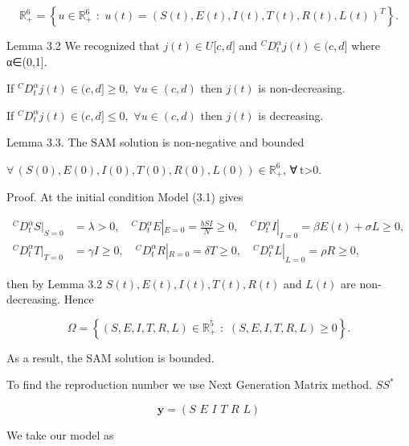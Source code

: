 \documentclass[10pt]{NSP1}
\begin{document}
\[
\mathbb{R}_{+}^{6} = \left\{ u \in \mathbb{R}_{+}^{6}\mspace{6mu}:\mspace{6mu} u(t) = \left( S(t),E(t),I(t),T(t),R(t),L(t) \right)^{T} \right\}.
\]

Lemma 3.2 We recognized that \(j(t) \in U\lbrack c,d\rbrack\) and \(^{C}D_{t}^{\alpha}j(t) \in (c,d\rbrack\) where α∈(0,1].

If \(^{C}D_{t}^{\alpha}j(t) \in (c,d\rbrack \geq 0,\mspace{6mu}\forall u \in (c,d)\) then \(j(t)\) is non-decreasing.

If \(^{C}D_{t}^{\alpha}j(t) \in (c,d\rbrack \leq 0,\mspace{6mu}\forall u \in (c,d)\) then \(j(t)\) is decreasing.

\par\medskip{}\smallskip

Lemma 3.3. The SAM solution is non-negative and bounded

\(\forall\,\left( S(0),E(0),I(0),T(0),R(0),L(0) \right) \in \mathbb{R}_{+}^{6}\), ∀ t\textgreater{}0.

Proof. At the initial condition Model (3.1) gives

\[
\begin{matrix}
^{C}D_{t}^{\alpha}S|_{S = 0} & = \lambda > 0,\quad^{C}D_{t}^{\alpha}E\left|_{E = 0} = \frac{bSI}{N} \geq 0,\quad^{C}D_{t}^{\alpha}I \right|_{I = 0} = \beta E(t) + \sigma L \geq 0, \\
^{C}D_{t}^{\alpha}T|_{T = 0} & = \gamma I \geq 0,\quad^{C}D_{t}^{\alpha}R\left|_{R = 0} = \delta T \geq 0,\quad^{C}D_{t}^{\alpha}L \right|_{L = 0} = \rho R \geq 0,
\end{matrix}
\]

then by Lemma 3.2 \(S(t),E(t),I(t),T(t),R(t)\) and \(L(t)\) are non-decreasing. Hence

\[
\Omega = \left\{ (S,E,I,T,R,L) \in \mathbb{R}_{+}^{5}\mspace{6mu}:\mspace{6mu}(S,E,I,T,R,L) \geq 0 \right\}.
\]

As a result, the SAM solution is bounded.

\par\medskip{}\smallskip

To find the reproduction number we use Next Generation Matrix method. \(SS^{*}\)

\[
\mathbf{y} = (S\mspace{6mu} E\mspace{6mu} I\mspace{6mu} T\mspace{6mu} R\mspace{6mu} L)
\]

We take our model as
\end{document}

